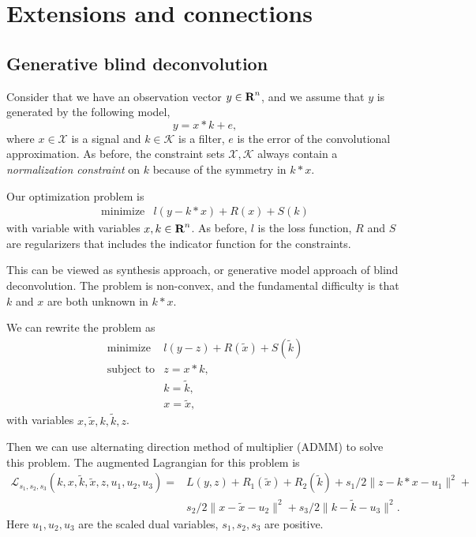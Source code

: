 \documentclass[12pt]{article}
\begin{document}
\section{Extensions and connections}
\subsection{Generative blind deconvolution }
Consider that we have an observation vector $y\in {\mbox{\bf R}}^n$, and we assume that $y$ is generated by the following model,
$$y=x*k + e,$$
where $x\in \mathcal X$ is a signal and $k\in \mathcal K$ is a filter, $e$ is the error of the convolutional approximation. 
As before, the constraint sets $\mathcal X, \mathcal K$ always contain 
a \emph{normalization constraint} on $k$ because of the symmetry in $k*x$. 

Our optimization problem is
\[
\begin{array}{ll}
\mbox{minimize}   & l(y-k*x)+R(x)+ S(k)
\end{array}
\]
with variable  with variables $x,k \in {\mbox{\bf R}}^n$. 
 As before, $l$ is the loss function, $R$
and $S$ are regularizers that includes the indicator function for the constraints. 

This can be viewed as synthesis approach, or generative model approach of blind deconvolution. 
The problem is non-convex, and the fundamental difficulty is that $k$ and $x$ are both unknown in $k*x$.

 We can rewrite the problem as
\[
\begin{array}{ll}
\mbox{minimize}   &  l(y-z)+R(\tilde{x})+ S(\tilde{k})  \\
\mbox{subject to}  & z = x*k,\\
& k = \tilde{k},\\
& x = \tilde{x},
\end{array}
\]
with variables $x, \tilde{x}, k, \tilde{k},z$.

Then we can use alternating direction method of multiplier (ADMM) to solve this problem. 
The augmented Lagrangian for this problem is 
\[
\begin{array}{ll}
 \mathcal{L}_{s_1, s_2,s_3}(k, x,\tilde{k},\tilde{x}, z, u_1, u_2, u_3)=&L(y,z)+R_1(\tilde{x})+ R_2(\tilde{k})
 + s_1/2 \| z -k*x -u_1\|^2 + \\
& s_2/2 \| x- \tilde{x}-u_2\|^2+s_3/2 \| k- \tilde{k}-u_3\|^2.
\end{array}
\]
Here $u_1, u_2, u_3$ are the scaled dual variables, $s_1, s_2, s_3$ are positive. 
\end{document}
